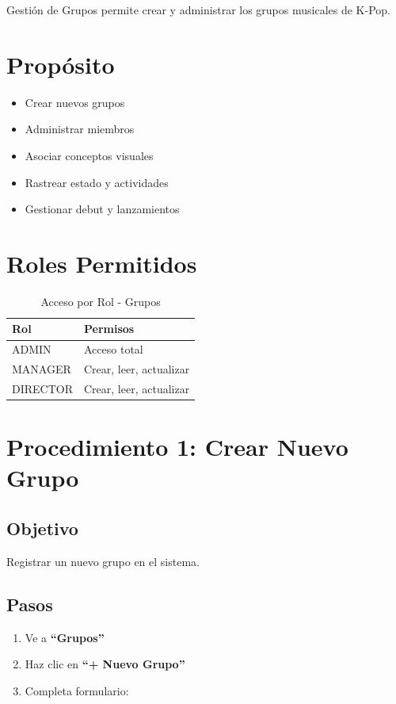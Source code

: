 \documentclass[12pt,a4paper,spanish,oneside]{report}
\begin{document}
Gestión de Grupos permite crear y administrar los grupos musicales de K-Pop.

\section{Propósito}

\begin{itemize}
    \item Crear nuevos grupos
    \item Administrar miembros
    \item Asociar conceptos visuales
    \item Rastrear estado y actividades
    \item Gestionar debut y lanzamientos
\end{itemize}

\section{Roles Permitidos}

\begin{table}[H]
\centering
\caption{Acceso por Rol - Grupos}
\begin{tabular}{|l|l|}
\hline
\textbf{Rol} & \textbf{Permisos} \\
\hline
ADMIN & Acceso total \\
\hline
MANAGER & Crear, leer, actualizar \\
\hline
DIRECTOR & Crear, leer, actualizar \\
\hline
\end{tabular}
\end{table}

\section{Procedimiento 1: Crear Nuevo Grupo}

\subsection{Objetivo}

Registrar un nuevo grupo en el sistema.

\subsection{Pasos}

\begin{enumerate}
    \item Ve a \textbf{``Grupos''}
    \item Haz clic en \textbf{``+ Nuevo Grupo''}
    \item Completa formulario:
\end{enumerate}
\end{document}
